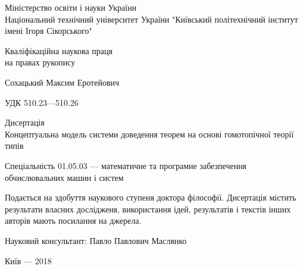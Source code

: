 \documentclass[twoside]{vakthesis}
\begin{document}
\begin{titlepage}
\begin{center}
\frontmatter
\thispagestyle{empty}
\noindent
\large Міністерство освіти і науки України \\
Національний технічний університет України
"Київський політехнічний інститут імені Ігоря Сікорського"
\vspace{0.5cm}
\begin{flushright}
\small Кваліфікаційна наукова праця \\
на правах рукопису
\end{flushright}
\vspace{1cm}
\Large Сохацький Максим Еротейович \\
\vspace{0.5cm}
\begin{flushright}
\small УДК 510.23---510.26
\vspace{1cm}
\end{flushright}
\Large Дисертація \\
\large Концептуальна модель системи доведення теорем на основі гомотопічної теорії типів \\
\vspace{0.5cm}
\begin{flushright}
\small Спеціальність 01.05.03 --- математичне та програмне забезпечення \\ обчислювальних машин і систем
\end{flushright}
\vspace{1cm}
\begin{flushleft}
\renewcommand{\baselinestretch}{1.0}
\small Подається на здобуття наукового ступеня доктора філософії. Дисертація містить результати власних
дослідженя, використання ідей, результатів і текстів інших авторів мають посилання на джерела.
\renewcommand{\baselinestretch}{1.5}
\end{flushleft}
\vspace{0.5cm}
\begin{flushright}
\small Науковий консультант: Павло Павлович Маслянко
\end{flushright}
\vspace{1cm}
Київ --- 2018
\end{center}
\end{titlepage}


\titleINF

\tableofcontents
\end{document}
